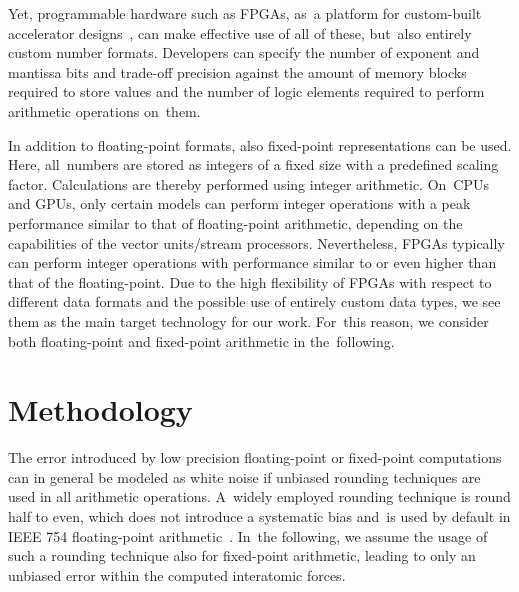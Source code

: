 \documentclass[computation,article,accept,moreauthors,pdftex]{Definitions/mdpi}
\begin{document}
Yet, programmable hardware such as FPGAs, as~a platform for custom-built accelerator designs~\cite{Strzodka2006, KenterVector, KenterPragma}, can make effective use of all of these, but~also entirely custom number formats.
Developers can specify the number of exponent and mantissa bits and trade-off precision against the amount of memory blocks required to store values and the number of logic elements required to perform arithmetic operations on~them.

In addition to floating-point formats, also fixed-point representations can be used. Here, all~numbers are stored as integers of a fixed size with a
predefined scaling factor. Calculations are thereby performed using integer arithmetic. On~CPUs and GPUs, only certain models can perform integer operations with a peak performance similar to that of floating-point arithmetic, depending on the capabilities of the vector units/stream processors. Nevertheless, FPGAs typically can perform integer operations with performance similar to or even higher than that of the floating-point. Due to the high flexibility of FPGAs with respect to different data formats and the possible use of entirely custom data types, we see them as the main target technology for our work. For~this reason, we consider both floating-point and fixed-point arithmetic in the~following.

\section{Methodology}
\label{sec:methodology}
{
The error introduced by low precision floating-point or fixed-point computations can in general be modeled as white noise if unbiased rounding techniques are used in all arithmetic operations. %
A~widely employed rounding technique is {round half to even}, which does not introduce a systematic bias and~is used by default in IEEE 754 floating-point arithmetic~\cite{IEEE2019}. In~the following, we assume the usage of such a rounding technique also for fixed-point arithmetic, leading to only an unbiased error within the computed interatomic forces. 
}
\end{document}
